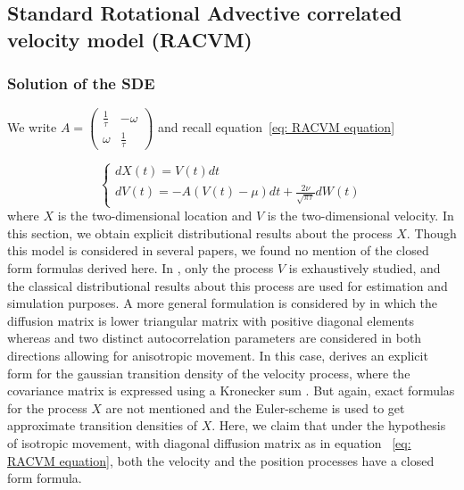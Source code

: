 \documentclass[11pt]{article}
\newcommand {\1}{\mathbb{1}}
\begin{document}
\subsection{Standard Rotational Advective correlated velocity model (RACVM)}
\label{section: RACVM}

\subsubsection{Solution of the SDE}

We write $A=\begin{pmatrix} 
	\frac{1}{\tau} & -\omega \\
	\omega & \frac{1}{\tau}
\end{pmatrix}$ and recall equation~\ref{eq: RACVM equation}

\begin{equation*} \left\{
	\begin{array}{l}
		dX(t)=V(t)dt \\
		dV(t)=-A(V(t)-\mu)dt+\frac{2\nu}{\sqrt{\pi \tau}} dW(t) 
	\end{array}
	\right.
	\label{eq: RACVM equation bis}
\end{equation*}
where $X$ is the two-dimensional location and $V$ is the two-dimensional velocity.
In this section, we obtain explicit distributional results about the process $X$. Though this model is considered in several papers, we found no mention of the closed form formulas derived here. In \cite{gurarie_correlated_2017}, only the process $V$ is exhaustively studied, and the classical distributional results about this process are used for estimation and simulation purposes.
A more general formulation is considered by \cite{albertsen_generalizing_2018} in which the diffusion matrix is lower triangular matrix with positive diagonal elements whereas and two distinct autocorrelation parameters are considered in both directions allowing for anisotropic movement.
In this case, \cite{albertsen_generalizing_2018} derives an explicit form for the gaussian transition density of the velocity process, where the covariance matrix is expressed using a Kronecker sum \cite{albertsen_generalizing_2018}. But again, exact formulas for the process $X$ are not mentioned and the Euler-scheme is used to get approximate transition densities of $X$. Here, we claim that under the hypothesis of isotropic movement, with diagonal diffusion matrix as in equation ~\ref{eq: RACVM equation}, both the velocity and the position processes have a closed form formula. \\
\end{document}
